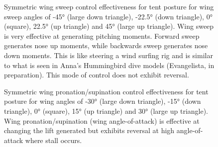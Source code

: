 \begin{figure}
\caption{Symmetric wing sweep control effectiveness for tent posture for wing sweep angles of \ang{-45} (large down triangle), \ang{-22.5} (down triangle), \ang{0} (square), \ang{+22.5} (up triangle) and \ang{+45} (large up triangle).  Wing sweep is very effective at generating pitching moments.  Forward sweep generates nose up moments, while backwards sweep generates nose down moments.  This is like steering a wind surfing rig and is similar to what is seen in Anna's Hummingbird dive models (Evangelista, in preparation). This mode of control does not exhibit reversal.}
\end{figure}
\begin{figure}
\caption{Symmetric wing pronation/supination control effectiveness for tent posture for wing angles of \ang{-30} (large down triangle), \ang{-15} (down triangle), \ang{0} (square), \ang{+15} (up triangle) and \ang{+30} (large up triangle).  Wing pronation/supination (wing angle-of-attack) is effective at changing the lift generated but exhibits reversal at high angle-of-attack where stall occurs.}
\end{figure}

\eject



